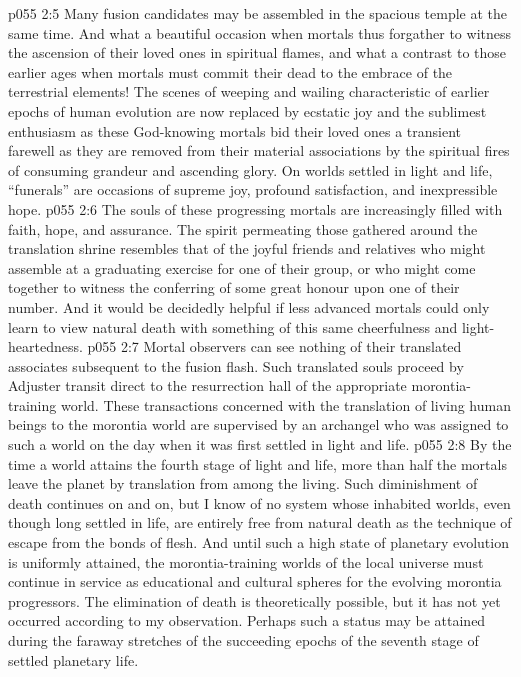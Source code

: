 \vs p055 2:5 Many fusion candidates may be assembled in the spacious temple at the same time. And what a beautiful occasion when mortals thus forgather to witness the ascension of their loved ones in spiritual flames, and what a contrast to those earlier ages when mortals must commit their dead to the embrace of the terrestrial elements! The scenes of weeping and wailing characteristic of earlier epochs of human evolution are now replaced by ecstatic joy and the sublimest enthusiasm as these God\hyp{}knowing mortals bid their loved ones a transient farewell as they are removed from their material associations by the spiritual fires of consuming grandeur and ascending glory. On worlds settled in light and life, “funerals” are occasions of supreme joy, profound satisfaction, and inexpressible hope.
\vs p055 2:6 The souls of these progressing mortals are increasingly filled with faith, hope, and assurance. The spirit permeating those gathered around the translation shrine resembles that of the joyful friends and relatives who might assemble at a graduating exercise for one of their group, or who might come together to witness the conferring of some great honour upon one of their number. And it would be decidedly helpful if less advanced mortals could only learn to view natural death with something of this same cheerfulness and light\hyp{}heartedness.
\vs p055 2:7 \pc Mortal observers can see nothing of their translated associates subsequent to the fusion flash. Such translated souls proceed by Adjuster transit direct to the resurrection hall of the appropriate morontia\hyp{}training world. These transactions concerned with the translation of living human beings to the morontia world are supervised by an archangel who was assigned to such a world on the day when it was first settled in light and life.
\vs p055 2:8 By the time a world attains the fourth stage of light and life, more than half the mortals leave the planet by translation from among the living. Such diminishment of death continues on and on, but I know of no system whose inhabited worlds, even though long settled in life, are entirely free from natural death as the technique of escape from the bonds of flesh. And until such a high state of planetary evolution is uniformly attained, the morontia\hyp{}training worlds of the local universe must continue in service as educational and cultural spheres for the evolving morontia progressors. The elimination of death is theoretically possible, but it has not yet occurred according to my observation. Perhaps such a status may be attained during the faraway stretches of the succeeding epochs of the seventh stage of settled planetary life.
